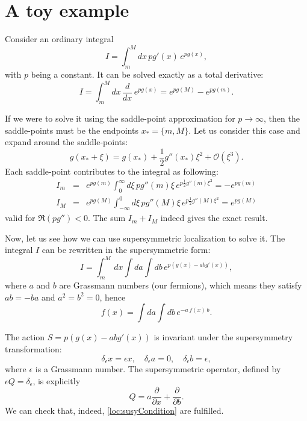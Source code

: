 \section{A toy example}

Consider an ordinary integral
\begin{equation}
 I = \int_m^M dx \,p g'(x)\,e^{p g(x)}, 
\end{equation}
with $p$ being a constant.
It can be solved exactly as a total derivative:
\begin{equation}
 I = \int_m^M  dx \, \dfrac{d}{d x}\,e^{p g(x)} 
   = e^{p g(M)}-e^{p g(m)}.
\end{equation}


If we were to solve it using the saddle-point approximation for $p \rightarrow \infty$,
then the saddle-points must be the endpoints $x_* = \{m, M\}$.
Let us consider this case and expand around the saddle-points:
\begin{equation}
 g(x_*+\xi) = g(x_*)+\frac{1}{2} g''(x_*) \xi^2 +\mathcal{O}(\xi^3).
\end{equation}
Each saddle-point contributes to the integral as following:
\begin{eqnarray}
 I_m &=& e^{p g(m)} \int_0^\infty  d\xi \, p g''(m) \xi\, e^{p \frac{1}{2} g''(m) \xi^2 } 
      =- e^{p g(m)} \\
 I_M &=& e^{p g(M)} \int_{-\infty}^0 d\xi \, p g''(M) \xi\, e^{p\frac{1}{2} g''(M) \xi^2 } 
      = e^{p g(M)}   
\end{eqnarray}
valid for $\Re(p g'') < 0$.
The sum $I_m + I_M$ indeed gives the exact result.


Now, let us see how we can use supersymmetric localization to solve it. 
The integral $I$ can be rewritten in the supersymmetric form:
\begin{equation}
 I = \int_m^M \, dx \int da \int db \, e^{p(g(x)-a b g'(x))},
\end{equation}
where $a$ and $b$ are Grassmann numbers (our fermions), 
which means they satisfy $a b = -b a$ and $a^2=b^2=0$, hence 
\begin{equation} \label{GrassmannIntegral}
 f(x) = \int da \int db \, e^{-a\, f(x) \,b }.
\end{equation}


The action $S=p(g(x)-a b g'(x))$ is invariant under the supersymmetry transformation:
\begin{equation}
 \delta_\epsilon x = \epsilon x, 
 \quad
 \delta_\epsilon a = 0,
 \quad 
 \delta_\epsilon b = \epsilon,
\end{equation}
where $\epsilon$ is a Grassmann number.
The supersymmetric operator, defined by $\epsilon Q = \delta_\epsilon$,
is explicitly
\begin{equation}
 Q = a \frac{\partial }{\partial x}+\frac{\partial }{\partial b}.
\end{equation}
We can check that, indeed, \eqref{loc:susyCondition} are fulfilled.


